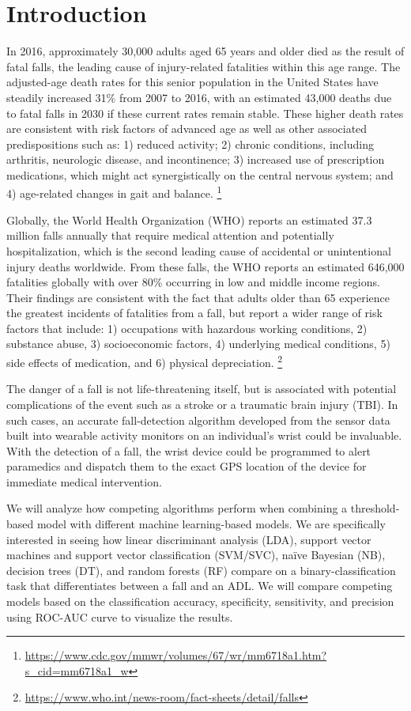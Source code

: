 \documentclass{llncs}
\begin{document}
\section{Introduction}

In 2016, approximately 30,000 adults aged 65 years and older died as the result of fatal falls, the leading cause of injury-related fatalities within this age range. The adjusted-age death rates for this senior population in the United States have steadily increased 31\% from 2007 to 2016, with an estimated 43,000 deaths due to fatal falls in 2030 if these current rates remain stable. These higher death rates are consistent with risk factors of advanced age as well as other associated predispositions such as: 1) reduced activity; 2) chronic conditions, including arthritis, neurologic disease, and incontinence; 3) increased use of prescription medications, which might act synergistically on the central nervous system; and 4) age-related changes in gait and balance.
\footnote{\url{https://www.cdc.gov/mmwr/volumes/67/wr/mm6718a1.htm?s_cid=mm6718a1_w}}

	Globally, the World Health Organization (WHO) reports an estimated 37.3 million falls annually that require medical attention and potentially hospitalization, which is the second leading cause of accidental or unintentional injury deaths worldwide. From these falls, the WHO reports an estimated 646,000 fatalities globally with over 80\% occurring in low and middle income regions. Their findings are consistent with the fact that adults older than 65 experience the greatest incidents of fatalities from a fall, but report a wider range of risk factors that include: 1) occupations with hazardous working conditions, 2) substance abuse, 3) socioeconomic factors, 4) underlying medical conditions, 5) side effects of medication, and 6) physical depreciation. 
\footnote{\url{https://www.who.int/news-room/fact-sheets/detail/falls}}

	The danger of a fall is not life-threatening itself, but is associated with potential complications of the event such as a stroke or a traumatic brain injury (TBI). In such cases, an accurate fall-detection algorithm developed from the sensor data built into wearable activity monitors on an individual's wrist could be invaluable. With the detection of a fall, the wrist device could be programmed to alert paramedics and dispatch them to the exact GPS location of the device for immediate medical intervention. 

	We will analyze how competing algorithms perform when combining a threshold-based model with different machine learning-based models. We are specifically interested in seeing how linear discriminant analysis (LDA), support vector machines and support vector classification (SVM/SVC), naïve Bayesian (NB), decision trees (DT), and random forests (RF) compare on a binary-classification task that differentiates between a fall and an ADL. We will compare competing models based on the classification accuracy, specificity, sensitivity, and precision using ROC-AUC curve to visualize the results. 
	
\end{document}
